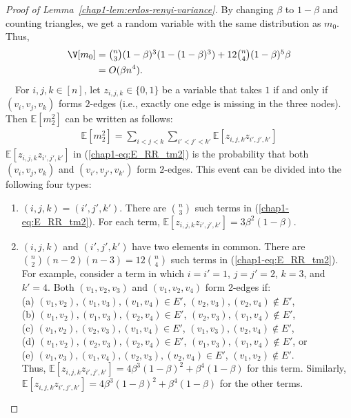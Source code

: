 \begin{proof}[Proof of Lemma~\ref{chap1-lem:erdos-renyi-variance}]
By changing $\beta$ to $1-\beta$ and counting triangles, we get a random variable with the same distribution as $m_0$. Thus,
\begin{align*}
  \V[m_0] 
  &= \textstyle{\binom{n}{3} (1-\beta)^3(1-(1-\beta)^3) + 12\binom{n}{4} (1-\beta)^5\beta}
  \\
  &= O(\beta n^4).
\end{align*}
\smallskip
{}~~For $i,j,k \in [n]$, let $z_{i,j,k} \in \{0,1\}$ be a variable that takes $1$ if and only if 
$(v_i, v_j, v_k)$ forms $2$-edges (i.e., exactly one edge is missing in the three nodes). 
Then $\mathbb{E}[m_2^2]$ can be written as follows:
\begin{align}
  \mathbb{E}[m_2^2] = \sum_{i<j<k} \sum_{i'<j'<k'}
  \mathbb{E}[z_{i,j,k} z_{i',j',k'}] 
  \label{chap1-eq:E_RR_tm2}
\end{align}
$\mathbb{E}[z_{i,j,k} z_{i',j',k'}]$ in (\ref{chap1-eq:E_RR_tm2}) is the probability that both $(v_i,v_j,v_k)$ and $(v_{i'},v_{j'},v_{k'})$ form $2$-edges. 
This event can be divided into the following four types:
\begin{enumerate}
	\item $(i,j,k)=(i',j',k')$. There are $\binom{n}{3}$ such terms in (\ref{chap1-eq:E_RR_tm2}). 
    For each term, $\mathbb{E}[z_{i,j,k} z_{i',j',k'}]=3\beta^2(1-\beta)$. 
	\item $(i,j,k)$ and $(i',j',k')$ have two elements in common. 
	There are $\binom{n}{2}(n-2)(n-3) = 12 \binom{n}{4}$ such terms in (\ref{chap1-eq:E_RR_tm2}). 
	For example, consider a term in which $i=i'=1$, $j=j'=2$, $k=3$, and $k'=4$. 
	Both $(v_1,v_2,v_3)$ and $(v_1,v_2,v_4)$ form 2-edges if:\\
	(a) $(v_1,v_2), (v_1,v_3), (v_1,v_4) \in E'$, $(v_2,v_3), (v_2,v_4) \notin E'$, \\
	(b) $(v_1,v_2), (v_1,v_3), (v_2,v_4) \in E'$, $(v_2,v_3), (v_1,v_4) \notin E'$, \\
	(c) $(v_1,v_2), (v_2,v_3), (v_1,v_4) \in E'$, $(v_1,v_3), (v_2,v_4) \notin E'$, \\
	(d) $(v_1,v_2), (v_2,v_3), (v_2,v_4) \in E'$, $(v_1,v_3), (v_1,v_4) \notin E'$, or \\
	(e) $(v_1,v_3), (v_1,v_4), (v_2,v_3), (v_2,v_4) \in E'$, $(v_1,v_2) \notin E'$. \\
    Thus, $\mathbb{E}[z_{i,j,k} z_{i',j',k'}]=4\beta^3(1-\beta)^2 + \beta^4(1-\beta)$ for this term. 
    Similarly, $\mathbb{E}[z_{i,j,k} z_{i',j',k'}]=4\beta^3(1-\beta)^2 + \beta^4(1-\beta)$ for the other terms.

\end{enumerate}
\end{proof}
